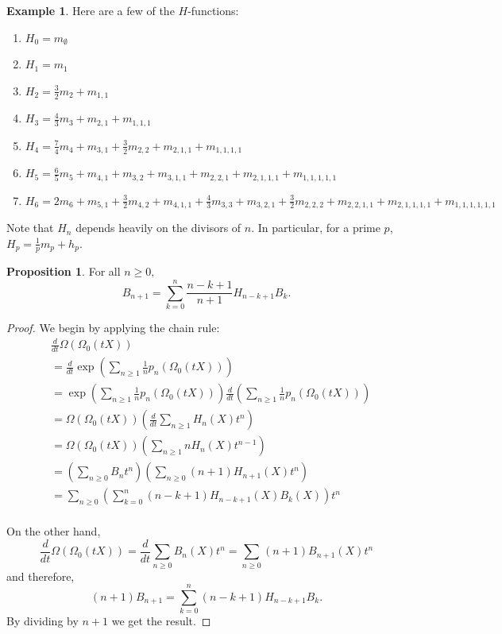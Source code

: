 \documentclass[12pt,reqno]{amsart}
\theoremstyle{definition}
\newtheorem{prop}[thm]{Proposition}
\newtheorem{example}{Example}
\begin{document}
\begin{example}
    Here are a few of the $H$-functions:
    \begin{enumerate}
        \item $H_0 = m_{\emptyset}$
        \item $H_1 = m_{1}$
        \item $H_{2} = \frac{3}{2}m_{2} + m_{1,1}$
        \item $H_3 = \frac{4}{3} m_{3} + m_{2,1} + m_{1,1,1}$
        \item $H_4 = \frac{7}{4} m_{4} + m_{3,1} + \frac{3}{2} m_{2,2} + m_{2,1,1} + m_{1,1,1,1}$
        \item $H_5 = \frac{6}{5} m_{5} + m_{4,1} + m_{3,2} + m_{3,1,1} + m_{2,2,1} + m_{2,1,1,1}+m_{1,1,1,1,1}$
        \item $H_6 = 2m_6 + m_{5,1} + \frac{3}{2}m_{4,2}+ m_{4,1,1} + \frac{4}{3}m_{3,3} + m_{3,2,1} + \frac{3}{2}m_{2,2,2}+m_{2,2,1,1}+m_{2,1,1,1,1}+m_{1,1,1,1,1,1}$
    \end{enumerate}
Note that $H_n$ depends heavily on the divisors of $n.$ In particular, for a prime $p$, 
$H_p = \frac{1}{p} m_{p} + h_p.$

\end{example}


\begin{prop}
For all $n \geq 0,$
    $$B_{n+1} = \sum_{k=0}^{n} \frac{n-k+1}{n+1} H_{n-k+1} B_k.$$
\end{prop}
\begin{proof}
We begin by applying the chain rule:
    \begin{align*}
        &\frac{d}{dt} \Omega\left( \Omega_0(tX) \right) \\
        &= \frac{d}{dt} \exp\left( \sum_{n \geq 1} \frac{1}{n} p_n\left( \Omega_0(tX) \right) \right) \\
        &= \exp\left( \sum_{n \geq 1} \frac{1}{n} p_n\left( \Omega_0(tX) \right) \right)  \frac{d}{dt} \left( \sum_{n \geq 1} \frac{1}{n} p_n\left( \Omega_0(tX) \right) \right) \\
        &= \Omega\left( \Omega_0(tX) \right) \left(\frac{d}{dt} \sum_{n \geq 1} H_n(X) t^n \right) \\
        &= \Omega\left( \Omega_0(tX) \right) \left(\sum_{n \geq 1} nH_n(X) t^{n-1} \right) \\
        &= \left(\sum_{n \geq 0}B_n t^n \right) \left( \sum_{n \geq 0} (n+1)H_{n+1}(X)t^{n}  \right)  \\ 
        &=  \sum_{n \geq 0} \left( \sum_{k=0}^{n} (n-k+1)H_{n-k+1}(X)B_k(X) \right) t^n  \\
    \end{align*}

    On the other hand, 
    $$\frac{d}{dt} \Omega\left( \Omega_0(tX) \right) = \frac{d}{dt} \sum_{n \geq 0} B_n(X) t^n = \sum_{n \geq 0} (n+1)B_{n+1}(X) t^{n}$$ and therefore,
    $$(n+1)B_{n+1} = \sum_{k=0}^{n} (n-k+1)H_{n-k+1}B_k.$$ By dividing by $n+1$ we get the result.
\end{proof}
\end{document}
